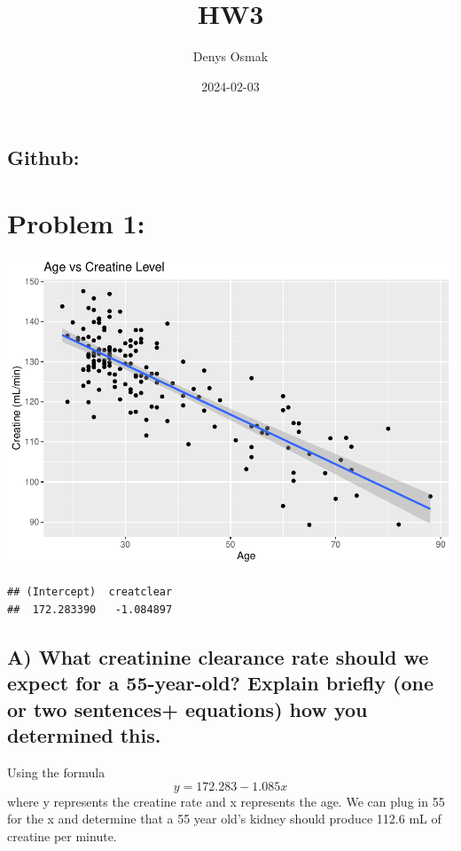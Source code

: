 \documentclass[
]{article}
\title{HW3}
\author{Denys Osmak}
\date{2024-02-03}
\begin{document}
\maketitle

\hypertarget{github}{%
\subsection{Github:}\label{github}}

\hypertarget{problem-1}{%
\section{Problem 1:}\label{problem-1}}

\includegraphics{HW3_files/figure-latex/unnamed-chunk-2-1.pdf}

\begin{verbatim}
## (Intercept)  creatclear 
##  172.283390   -1.084897
\end{verbatim}

\hypertarget{a-what-creatinine-clearance-rate-should-we-expect-for-a-55-year-old-explain-briefly-one-or-two-sentences-equations-how-you-determined-this.}{%
\subsection{A) What creatinine clearance rate should we expect for a
55-year-old? Explain briefly (one or two sentences+ equations) how you
determined
this.}\label{a-what-creatinine-clearance-rate-should-we-expect-for-a-55-year-old-explain-briefly-one-or-two-sentences-equations-how-you-determined-this.}}

Using the formula \[ y = 172.283 - 1.085x \] where y represents the
creatine rate and x represents the age. We can plug in 55 for the x and
determine that a 55 year old's kidney should produce 112.6 mL of
creatine per minute.
\end{document}
